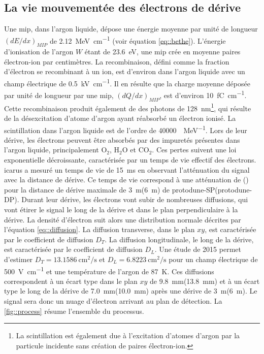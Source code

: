     \subsection{La vie mouvementée des électrons de dérive}
        Une \gls{mip}, dans l'argon liquide, dépose une énergie moyenne par unité de longueur $(dE/dx)_{MIP}$ de \SI{2.12}{\mega\electronvolt\per\centi\meter} (voir équation \eqref{eq::bethe}). L'énergie d'ionisation de l'argon $W$ étant de \SI{23.6}{\eV}, une \gls{mip} crée en moyenne  paires électron-ion par centimètres.
        La recombinaison, défini comme la fraction d'électron se recombinant à un ion, est d'environ  dans l'argon liquide avec un champ électrique de \SI{0.5}{\kilo\volt\per\centi\meter}. Il en résulte que la charge moyenne déposée par unité de longueur par une \gls{mip}, $(dQ/dx)_{MIP}$, est d'environ \SI{10}{\femto\coulomb\per\centi\meter}. Cette recombinaison produit également de des photons de \SI{128}{\nano\meter}\footnote{La scintillation est également due à l'excitation d'atomes d'argon par la particule incidente sans création de paires électron-ion.}, qui résulte de la désexcitation d'atome d'argon ayant réabsorbé un électron ionisé. La scintillation dans l'argon liquide est de l'ordre de \SI{40000}{\gamma\per\mega\eV}\cite{Cennini1999}. Lors de leur dérive, les électrons peuvent être absorbés par des impuretés présentes dans l'argon liquide, principalement O$_2$, H$_2$O et CO$_2$. Ces pertes suivent une loi exponentielle décroissante, caractérisée par un temps de vie effectif des électrons. \gls{icarus} a mesuré un temps de vie de \SI{15}{\milli\second}\cite{Antonello2014} en observant l'atténuation du signal avec la distance de dérive. Ce temps de vie correspond à une atténuation de () pour la distance de dérive maximale de \SI{3}{\meter}(\SI{6}{\meter}) de proto\gls{dune}-SP(proto\gls{dune}-DP). Durant leur dérive, les électrons vont subir de nombreuses diffusions, qui vont étirer le signal le long de la dérive et dans le plan perpendiculaire à la dérive. La densité d'électron suit alors une distribution normale décrites par l'équation \eqref{eq::diffusion}. La diffusion transverse, dans le plan $xy$, est caractérisée par le coefficient de diffusion $D_T$. La diffusion longitudinale, le long de la dérive, est caractérisée par le coefficient de diffusion $D_L$. Une étude de 2015\cite{Li2015} permet d'estimer $D_T=\SI{13.1586}{\centi\meter\squared\per\second}$ et $D_L=\SI{6.8223}{\centi\meter\squared\per\second}$ pour un champ électrique de \SI{500}{\volt\per\centi\meter} et une température de l'argon de \SI{87}{\kelvin}. Ces diffusions correspondent à un écart type dans le plan $xy$ de \SI{9.8}{\milli\meter}(\SI{13.8}{\milli\meter}) et à un écart type le long de la dérive de \SI{7.0}{\milli\meter}(\SI{10.0}{\milli\meter}) après une dérive de \SI{3}{\meter}(\SI{6}{\meter}). Le signal sera donc un nuage d'électron arrivant au plan de détection. La \autoref{fig::process} résume l'ensemble du processus.

